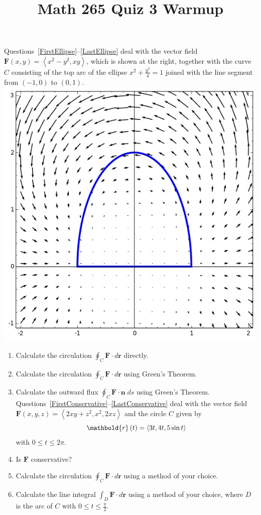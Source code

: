 \documentclass[12pt]{article}
\title{Math 265 Quiz 3 Warmup}\author{}\date{}
\let\cos\relax\DeclareMathOperator{\cos}{\mathsf{cos}}
\begin{document}
\maketitle
\thispagestyle{empty}
\begin{multicols}{2}
Questions~\ref{FirstEllipse}--\ref{LastEllipse}
deal with the vector field $\mathbold{F}\left(x,y\right)
=\left\langle x^2-y^2,xy\right\rangle$, which is shown
at the right, together with the curve $C$ consisting of
the top arc of the ellipse $x^2+\frac{y^2}{4}=1$
joined with the line segment from $\left(-1,0\right)$
to $\left(0,1\right)$.
\includegraphics[scale=.4]{Ellipse}
\end{multicols}
\begin{enumerate}
\item\label{FirstEllipse}
Calculate the circulation $\oint_C\mathbold{F}
\cdot d\mathbold{r}$ directly.
\item Calculate the circulation $\oint_C\mathbold{F}
\cdot d\mathbold{r}$ using Green's Theorem.
\item\label{LastEllipse} Calculate the outward flux $\oint_C\mathbold{F}
\cdot\mathbold{n}\;ds$ using Green's Theorem.
Questions~\ref{FirstConservative}--\ref{LastConservative}
deal with
the vector field $\mathbold{F}\left(x,y,z\right)
=\left\langle 2xy+z^2,x^2,2xz\right\rangle$
and the circle $C$ given by
\[\mathbold{r}\left(t\right)=\left\langle
3\cos{t},4\cos{t},5\sin{t}\right\rangle\]
with $0\le t\le 2\pi$.
\item\label{FirstConservative} Is $\mathbold{F}$ conservative?
\item Calculate the circulation $\oint_C\mathbold{F}
\cdot d\mathbold{r}$ using a method of your choice.
\item\label{LastConservative}
Calculate the line integral $\int_D\mathbold{F}
\cdot d\mathbold{r}$ using a method of your choice,
where $D$ is the arc of $C$ with $0\le t\le\frac{\pi}{2}$.
\end{enumerate}
\end{document}
